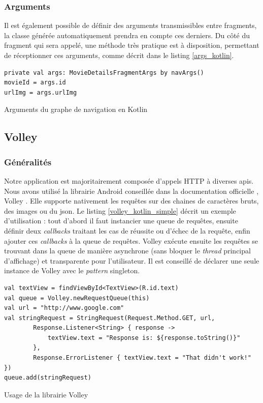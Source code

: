 \subsubsection{Arguments}
Il est également possible de définir des arguments transmissibles entre fragments, la classe générée automatiquement prendra en compte ces derniers. Du côté du fragment qui sera appelé, une méthode très pratique est à disposition, permettant de réceptionner ces arguments, comme décrit dans le listing \ref{args_kotlin}.
\bigbreak
\begin{code}
    \begin{verbatim}
private val args: MovieDetailsFragmentArgs by navArgs()
movieId = args.id
urlImg = args.urlImg
    \end{verbatim}
    \caption{Arguments du graphe de navigation en Kotlin}
    \label{args_kotlin}
\end{code}
\bigbreak


\subsection{Volley}
\subsubsection{Généralités}
Notre application est majoritairement composée d'appels HTTP à diverses \acrshort{api}s. Nous avons utilisé la librairie Android conseillée dans la documentation officielle \cite{docandroid}, Volley \cite{volley}. Elle supporte nativement les requêtes sur des chaines de caractères bruts, des images ou du \acrshort{json}. Le listing \ref{volley_kotlin_simple} décrit un exemple d'utilisation : tout d'abord il faut instancier une queue de requêtes, ensuite définir deux \textit{callbacks} traitant les cas de réussite ou d'échec de la requête, enfin ajouter ces \textit{callbacks} à la queue de requêtes. Volley exécute ensuite les requêtes se trouvant dans la queue de manière asynchrone (sans bloquer le \textit{thread} principal d'affichage) et transparente pour l'utilisateur. Il est conseillé de déclarer une seule instance de Volley avec le \textit{pattern} singleton.
\bigbreak
\begin{code}
    \begin{verbatim}
val textView = findViewById<TextView>(R.id.text)
val queue = Volley.newRequestQueue(this)
val url = "http://www.google.com"
val stringRequest = StringRequest(Request.Method.GET, url,
        Response.Listener<String> { response ->
            textView.text = "Response is: ${response.toString()}"
        },
        Response.ErrorListener { textView.text = "That didn't work!" })
queue.add(stringRequest)
    \end{verbatim}
    \caption{Usage de la librairie Volley}
    \label{volley_kotlin_simple}
\end{code}
\bigbreak

